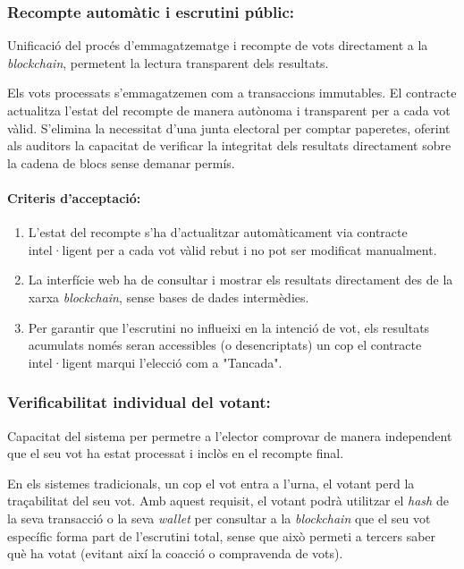 \subsubsection{Recompte automàtic i escrutini públic:}
Unificació del procés d'emmagatzematge i recompte de vots directament a la \textit{blockchain}, permetent la lectura transparent dels resultats.

Els vots processats s'emmagatzemen com a transaccions immutables. El contracte actualitza l'estat del recompte de manera autònoma i transparent per a cada vot vàlid. 
S'elimina la necessitat d'una junta electoral per comptar paperetes, oferint als auditors la capacitat de verificar la integritat dels resultats directament sobre la cadena de blocs sense demanar permís.

\paragraph{Criteris d'acceptació:}
\begin{enumerate}[label=\roman*.]
    \item L'estat del recompte s'ha d'actualitzar automàticament via contracte intel·ligent per a cada vot vàlid rebut i no pot ser modificat manualment.
    \item La interfície web ha de consultar i mostrar els resultats directament des de la xarxa \textit{blockchain}, sense bases de dades intermèdies.
    \item Per garantir que l'escrutini no influeixi en la intenció de vot, els resultats acumulats només seran accessibles (o desencriptats) un cop el contracte intel·ligent marqui l'elecció com a "Tancada".
\end{enumerate}

\subsubsection{Verificabilitat individual del votant:}
Capacitat del sistema per permetre a l'elector comprovar de manera independent que el seu vot ha estat processat i inclòs en el recompte final.

En els sistemes tradicionals, un cop el vot entra a l'urna, el votant perd la traçabilitat del seu vot. 
Amb aquest requisit, el votant podrà utilitzar el \textit{hash} de la seva transacció o la seva \textit{wallet} per consultar a la \textit{blockchain} que el seu vot específic forma part de l'escrutini total, sense que això permeti a tercers saber què ha votat (evitant així la coacció o compravenda de vots).

